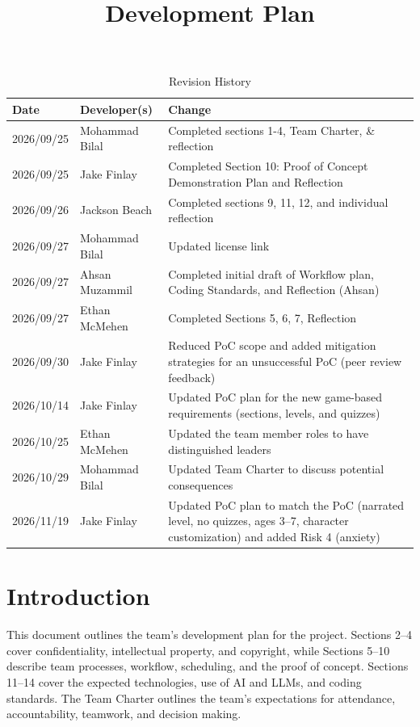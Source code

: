 \documentclass{article}
\title{Development Plan\\\progname}
\author{\authname}
\date{}
\begin{document}
\maketitle

\newpage{}

\begin{table}[hp]
\caption{Revision History} \label{TblRevisionHistory}
\begin{tabularx}{\textwidth}{llX}
\toprule
\textbf{Date} & \textbf{Developer(s)} & \textbf{Change}\\
\midrule
2026/09/25 & Mohammad Bilal & Completed sections 1-4, Team Charter, \& reflection \\
2026/09/25 & Jake Finlay & Completed Section 10: Proof of Concept Demonstration Plan and Reflection \\
2026/09/26 & Jackson Beach & Completed sections 9, 11, 12, and individual reflection \\
2026/09/27 & Mohammad Bilal & Updated license link \\
2026/09/27 & Ahsan Muzammil & Completed initial draft of Workflow plan, Coding Standards, and Reflection (Ahsan)\\
2026/09/27 & Ethan McMehen & Completed Sections 5, 6, 7, Reflection \\
2026/09/30 & Jake Finlay & Reduced PoC scope and added mitigation strategies for an unsuccessful PoC (peer review feedback) \\
2026/10/14 & Jake Finlay & Updated PoC plan for the new game-based requirements (sections, levels, and quizzes) \\
2026/10/25 & Ethan McMehen & Updated the team member roles to have distinguished leaders \\
2026/10/29 & Mohammad Bilal & Updated Team Charter to discuss potential consequences \\
2026/11/19 & Jake Finlay & Updated PoC plan to match the PoC (narrated level, no quizzes, ages 3--7, character customization) and added Risk 4 (anxiety) \\
\bottomrule
\end{tabularx}
\end{table}

\newpage{}

\section{Introduction}

This document outlines the team's development plan for the project.
Sections 2--4 cover confidentiality, intellectual property, and copyright,
while Sections 5--10 describe team processes, workflow, scheduling, and the proof of concept.
Sections 11--14 cover the expected technologies, use of AI and LLMs, and coding standards.
The Team Charter outlines the team's expectations for attendance, accountability, teamwork, and decision making.
\end{document}
